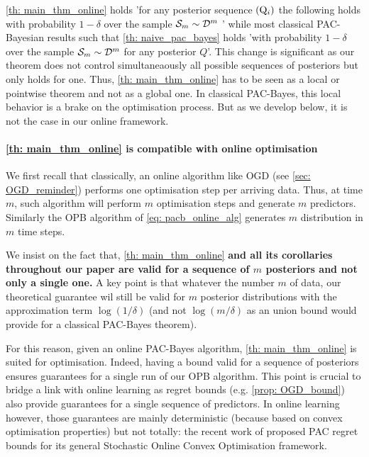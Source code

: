\cref{th: main_thm_online} holds 'for any posterior sequence $(\mathrm{Q}_{i})$ the following holds with probability $1-\delta$ over the sample $\mathcal{S}_m\sim\mathcal{D}^m$ ' while most classical PAC-Bayesian results such that \cref{th: naive_pac_bayes} holds 'with probability $1-\delta$ over the sample $\mathcal{S}_m\sim\mathcal{D}^m$ for any posterior $Q$'. This change is significant as our theorem does not control simultaneaously all possible sequences of posteriors but only holds for one.
Thus, \cref{th: main_thm_online} has to be seen as a local or pointwise theorem and not as a global one. In classical PAC-Bayes, this local behavior is a brake on the optimisation process. But as we develop below, it is not the case in our online framework.

\paragraph{\cref{th: main_thm_online} is compatible with online optimisation}

We first recall that classically, an online algorithm like OGD (see \cref{sec: OGD_reminder}) performs one optimisation step per arriving data. Thus, at time $m$, such algorithm will perform $m$ optimisation steps and generate $m$ predictors. Similarly the OPB algorithm of \cref{eq: pacb_online_alg} generates $m$ distribution in $m$ time steps.

We insist on the fact that, \cref{th: main_thm_online} \textbf{and all its corollaries throughout our paper are valid for a sequence of $m$ posteriors and not only a single one.} A key point is that whatever the number $m$ of data, our theoretical guarantee wil still be valid for $m$ posterior distributions with the approximation term $\log(1/\delta)$ (and not $\log(m/\delta)$ as an union bound would provide for a classical PAC-Bayes theorem).

For this reason, given an online PAC-Bayes algorithm, \cref{th: main_thm_online} is suited for optimisation. Indeed, having a bound valid for a sequence of posteriors ensures guarantees for a single run of our OPB algorithm. This point is crucial to bridge a link with online learning as regret bounds (e.g. \cref{prop: OGD_bound}) also provide guarantees for a single sequence of predictors. In online learning however, those guarantees are mainly deterministic (because based on convex optimisation properties) but not totally: the recent work of \cite{wintenberger2021stochastic} proposed PAC regret bounds for its general Stochastic Online Convex Optimisation framework.

